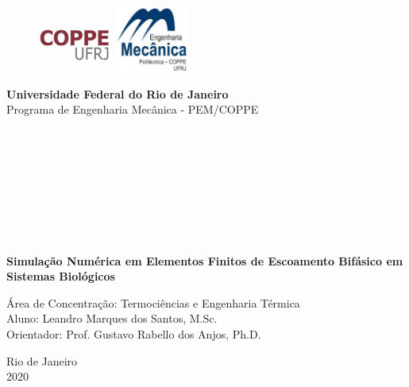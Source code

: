 \begin{titlepage}
\begin{center}


  \begin{figure}[hbt!]
		          \includegraphics[width=2.44cm,height=1.8cm]{figure/coppe.png}
		   \hfill \includegraphics[width=2.44cm,height=2.17cm]{figure/pem.png}
  \end{figure}



  \vspace{-2cm}
  \hspace{0cm}\large{\textbf{Universidade Federal do Rio de Janeiro}}\\
  \hspace{0cm}\large{Programa de Engenharia Mecânica - PEM/COPPE}\\

  \hspace{2cm}\large{}\\
  \hspace{2cm}\large{}\\
  \hspace{2cm}\large{}\\
  \hspace{2cm}\large{}\\

  \hspace{2cm}\large{}\\
  \hspace{2cm}\large{}\\
  \hspace{2cm}\large{}\\
  \hspace{2cm}\large{}\\


  \par
  \vspace{1cm}
  \textbf{\LARGE Simulação Numérica em Elementos Finitos de Escoamento Bifásico em Sistemas Biológicos }

  \par
  \vspace{0.5cm}
  {Área de Concentração: Termociências e Engenharia Térmica}\\
  \vspace{0.5cm}
  {Aluno: Leandro Marques dos Santos, M.Sc.}\\
  \vspace{0.3cm}
  {Orientador: Prof. Gustavo Rabello dos Anjos, Ph.D.}



  \par\vfill
  {\large Rio de Janeiro\\2020}

\end{center}
\end{titlepage}
